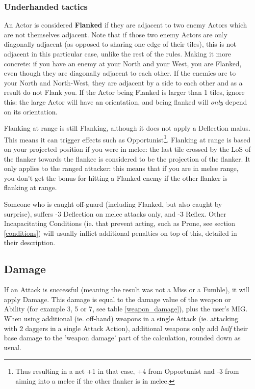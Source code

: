 \subsubsection{Underhanded tactics} 

An Actor is considered \textbf{Flanked} if they are adjacent to two enemy Actors which are not themselves adjacent. Note that if those two enemy Actors are only diagonally adjacent (as opposed to sharing one edge of their tiles), this is not adjacent in this particular case, unlike the rest of the rules. Making it more concrete: if you have an enemy at your North and your West, you are Flanked, even though they are diagonally adjacent to each other. If the enemies are to your North and North-West, they are adjacent by a side to each other and as a result do not Flank you. If the Actor being Flanked is larger than 1 tiles, ignore this: the large Actor will have an orientation, and being flanked will \textit{only} depend on its orientation. 

Flanking at range is still Flanking, although it does not apply a Deflection malus. This means it can trigger effects such as Opportunist\footnote{Thus resulting in a net +1 in that case, +4 from Opportunist and -3 from aiming into a melee if the other flanker is in melee.}. Flanking at range is based on your projected position if you were in melee: the last tile crossed by the LoS of the flanker towards the flankee is considered to be the projection of the flanker. It only applies to the ranged attacker: this means that if you are in melee range, you don't get the bonus for hitting a Flanked enemy if the other flanker is flanking at range.

Someone who is caught off-guard (including Flanked, but also caught by surprise), suffers -3 Deflection on melee attacks only, and -3 Reflex. Other Incapacitating Conditions (ie. that prevent acting, such as Prone, see section \ref{conditions}) will usually inflict additional penalties on top of this, detailed in their description.


\subsection{Damage}

If an Attack is successful (meaning the result was not a Miss or a Fumble), it will apply Damage. This damage is equal to the damage value of the weapon or Ability (for example 3, 5 or 7, see table \ref{weapon_damage}), plus the user's MIG. When using additional (ie. off-hand) weapons in a single Attack (ie. attacking with 2 daggers in a single Attack Action), additional weapons only add \textit{half} their base damage to the 'weapon damage' part of the calculation, rounded down as usual. 

